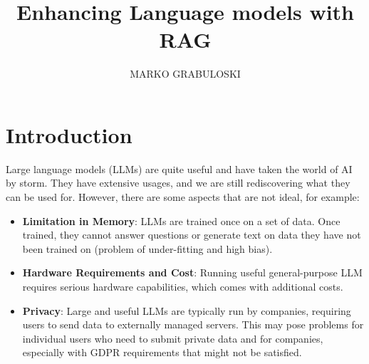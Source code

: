 \documentclass{wseas}
\author{MARKO GRABULOSKI}
\title{Enhancing Language models with RAG}
\begin{document}

\section{Introduction}

Large language models (LLMs) are quite useful and have taken the world of AI by storm. They have
extensive usages, and we are still rediscovering what they can be used
for. However, there are some aspects that are not ideal, for example:

\begin{itemize}

\item
  \textbf{Limitation in Memory}: LLMs are trained once on a set of data.
  Once trained, they cannot answer questions or generate text on data
  they have not been trained on (problem of under-fitting and high
  bias).
\item
  \textbf{Hardware Requirements and Cost}: Running useful
  general-purpose LLM requires serious hardware capabilities, which
  comes with additional costs.
\item
  \textbf{Privacy}: Large and useful LLMs are typically run by
  companies, requiring users to send data to externally managed servers.
  This may pose problems for individual users who need to submit private
  data and for companies, especially with GDPR requirements that might
  not be satisfied.
\end{itemize}
\end{document}
